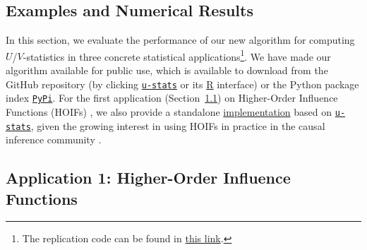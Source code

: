 \documentclass[sn-mathphys, natbib=false]{sn-jnl}
\newcommand{\libref}[2]{\href{#2}{\texttt{#1}}}
\def\package{\libref{u-stats}{https://github.com/zrq1706/U-Statistics-Python}}
\theoremstyle{plain}
\theoremstyle{definition}
\def\Einsum{\textsc{Einsum}}
\def\package{\libref{u-stats}{https://github.com/zrq1706/U-Statistics-Python}}
\newcommand{\opteinsum}{\libref{opt-einsum}{https://dgasmith.github.io/opt_einsum/}}
\begin{document}
\begin{bibunit}[agsm]
\section{Examples and Numerical Results}  
\label{sec:examples}

In this section, we evaluate the performance of our new algorithm for computing $U$/$V$-statistics in three concrete statistical applications\footnote{The replication code can be found in \href{https://github.com/cxy0714/U-Statistics-Experiments}{this link}.}. %
We have made our algorithm available for public use, which is available to download from the GitHub repository (by clicking \package{} or its \href{https://github.com/cxy0714/U-Statistics-R}{R} interface) or the Python package index \href{https://pypi.org/}{\texttt{PyPi}}.  For the first application (Section~\ref{sec:example_hoif}) on Higher-Order Influence Functions (HOIFs) \citep{robins2008higher}, we also provide a standalone \href{https://github.com/cxy0714/HOIF}{implementation} based on \package{}, given the growing interest in using HOIFs in practice in the causal inference community \citep{wager2024causal, zheng2025perturbed, cinelli2025challenges}.


\subsection{Application 1: Higher-Order Influence Functions}  
\label{sec:example_hoif}


\end{bibunit}
\end{document}
